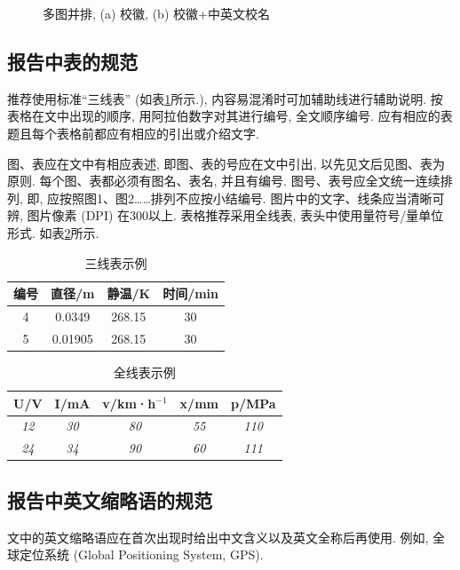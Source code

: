 \documentclass{urtemp}
\begin{document}
\begin{figure}[H]
\begin{minipage}{0.4\linewidth}
      \label{fig:1.2}
  \end{minipage}
  \caption{多图并排, (a) 校徽, (b) 校徽+中英文校名}
\end{figure}

\subsection{报告中表的规范}
推荐使用标准“三线表” (如表\ref{tab:eg1}所示.), 内容易混淆时可加辅助线进行辅助说明. 按表格在文中出现的顺序, 用阿拉伯数字对其进行编号, 全文顺序编号. 应有相应的表题且每个表格前都应有相应的引出或介绍文字. 

图、表应在文中有相应表述, 即图、表的号应在文中引出, 以先见文后见图、表为原则. 每个图、表都必须有图名、表名, 并且有编号. 图号、表号应全文统一连续排列, 即, 应按照图1、图2……排列不应按小结编号. 图片中的文字、线条应当清晰可辨, 图片像素 (DPI) 在300以上. 
表格推荐采用全线表, 表头中使用量符号/量单位形式. 如表\ref{tab:eg2}所示. 

\begin{table}[h]
\centering
\caption{三线表示例} \label{tab:eg1}
\begin{tabular}{cccc}
\toprule
{编号} &  {直径}/\si{\metre} & {静温}/\si{\kelvin} & {时间}/min\\
\midrule 
4 & 0.0349 & 268.15 & 30\\
5 & 0.01905 & 268.15 & 30\\
\bottomrule
\end{tabular}
\end{table}

\begin{table}[h]
\centering
\caption{全线表示例} \label{tab:eg2}
\begin{tabular}{|c|c|c|c|c|}
\hline
U/V & I/mA & v/km·h$^{-1}$ & x/mm & p/MPa \\ \hline
\textit{12} & \textit{30} & \textit{80} & \textit{55} & \textit{110} \\ \hline
\textit{24} & \textit{34} & \textit{90} & \textit{60} & \textit{111} \\ \hline
\end{tabular}
\end{table}

\subsection{报告中英文缩略语的规范}
文中的英文缩略语应在首次出现时给出中文含义以及英文全称后再使用. 例如, 全球定位系统 (Global Positioning System, GPS). 
\end{document}
